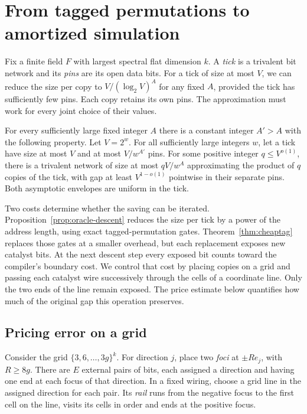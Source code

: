 \section{From tagged permutations to amortized simulation}
\label{sec:descent}

Fix a finite field $F$ with largest spectral flat dimension $k$. A
\emph{tick} is a trivalent bit network and its \emph{pins} are its open
data bits. For a tick of size at most $V$, we can reduce the size per
copy to $V/(\log_2 V)^A$ for any fixed $A$, provided the tick has
sufficiently few pins. Each copy retains its own pins. The approximation
must work for every joint choice of their values.

\begin{theorem}
\label{thm:collapse}
For every sufficiently large fixed integer $A$ there is a constant
integer $A'>A$ with the following property. Let $V=2^w$. For all
sufficiently large integers $w$, let a tick have size at most $V$ and
at most $V/w^{A'}$ pins. For some positive integer $q\le V^{o(1)}$,
there is a trivalent network of size at most $qV/w^A$ approximating
the product of $q$ copies of the tick, with gap at least $V^{1-o(1)}$
pointwise in their separate pins. Both asymptotic envelopes are
uniform in the tick.
\end{theorem}

Two costs determine whether the saving can be iterated.
Proposition~\ref{prop:oracle-descent} reduces the size per tick by a
power of the address length, using exact tagged-permutation gates.
Theorem~\ref{thm:cheaptag} replaces those gates at a smaller overhead,
but each replacement exposes new catalyst bits. At the next descent
step every exposed bit counts toward the compiler's boundary cost. We
control that cost by placing copies on a grid and passing each
catalyst wire successively through the cells of a coordinate line.
Only the two ends of the line remain exposed. The price estimate below
quantifies how much of the original gap this operation preserves.

\subsection{Pricing error on a grid}

Consider the grid $\{3,6,\ldots,3g\}^k$. For direction $j$, place
two \emph{foci} at $\pm Re_j$, with $R\ge8g$. There are $E$ external
pairs of bits, each assigned a direction and having one end at each
focus of that direction. In a fixed wiring, choose a grid line in the
assigned direction for each pair. Its \emph{rail} runs from the
negative focus to the first cell on the line, visits its cells in order
and ends at the positive focus.


